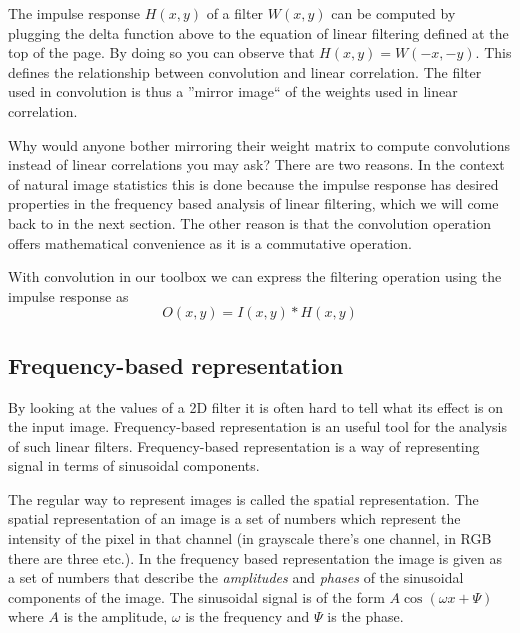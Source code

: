 \documentclass[]{article}
\begin{document}
The impulse response $H(x,y)$ of a filter $W(x,y)$ can be computed by plugging
the delta function above to the equation of linear filtering defined at the top
of the page. By doing so you can observe that $H(x,y) = W(-x,-y)$. This defines
the relationship between convolution and linear correlation. The filter used in
convolution is thus a ''mirror image`` of the weights used in linear
correlation.

Why would anyone bother mirroring their weight matrix to compute convolutions
instead of linear correlations you may ask? There are two reasons. In the
context of natural image statistics this is done because the impulse response
has desired properties in the frequency based analysis of linear filtering,
which we will come back to in the next section. The other reason is that the
convolution operation offers mathematical convenience as it is a commutative
operation\cite{deeplearningbook}.

With convolution in our toolbox we can express the filtering operation using
the impulse response as
\begin{equation}
  O(x,y) = I(x,y) \ast H(x,y)
\end{equation}

\subsection{Frequency-based representation}
\label{frequency-based-representation}
By looking at the values of a 2D filter it is often hard to tell what its
effect is on the input image. Frequency-based representation is an useful tool
for the analysis of such linear filters. Frequency-based representation is a
way of representing signal in terms of sinusoidal components.

The regular way to represent images is called the spatial representation. The
spatial representation of an image is a set of numbers which represent the
intensity of the pixel in that channel (in grayscale there's one channel, in
RGB there are three etc.). In the frequency based representation the image is
given as a set of numbers that describe the \textit{amplitudes} and
\textit{phases} of the sinusoidal components of the image. The sinusoidal
signal is of the form $A \cos(\omega x + \Psi)$ where $A$ is the amplitude,
$\omega$ is the frequency and $\Psi$ is the phase.
\end{document}
